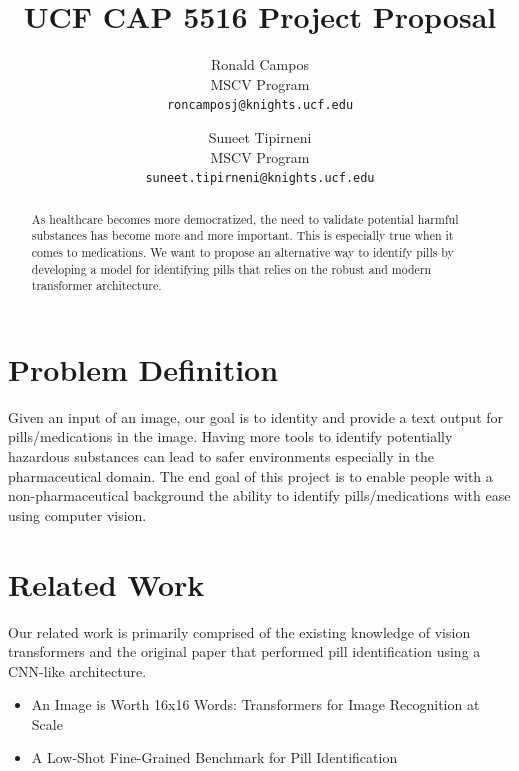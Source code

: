 \documentclass[10pt,twocolumn,letterpaper]{article}
\begin{document}
\title{UCF CAP 5516 Project Proposal}

\author{Ronald Campos\\
MSCV Program\\
{\tt\small roncamposj@knights.ucf.edu}
\and
Suneet Tipirneni\\
MSCV Program\\
{\tt\small  suneet.tipirneni@knights.ucf.edu}
}

\maketitle
\ificcvfinal\thispagestyle{empty}\fi


\begin{abstract}
    As healthcare becomes more democratized, the need to validate potential harmful substances has become more and more important. This is especially true when it comes to medications. We want to propose an alternative way to identify pills by developing
    a model for identifying pills that relies on the robust and modern transformer architecture.
\end{abstract}


\section{Problem Definition}
Given an input of an image, our goal is to identity and provide a text output for pills/medications in the image. Having more tools to identify potentially hazardous substances can lead to safer environments especially in the pharmaceutical domain. The end goal of this project is to enable people with a non-pharmaceutical background the ability to identify pills/medications with ease using computer vision.

\section{Related Work}

Our related work is primarily comprised of the existing knowledge of vision transformers and the original paper
that performed pill identification using a CNN-like architecture.
\begin{itemize}
    \item An Image is Worth 16x16 Words: Transformers for Image Recognition at Scale \cite{an_imageworth}
        \item A Low-Shot Fine-Grained Benchmark for Pill Identification \cite{ePill}
\end{itemize}
\end{document}
